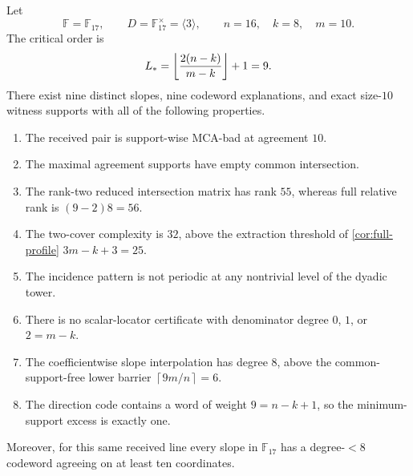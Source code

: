 \documentclass[11pt,a4paper]{amsart}
\numberwithin{equation}{section}
\theoremstyle{remark}
\newcommand{\F}{\mathbb F}\newcommand{\B}{\mathbb B}\newcommand{\K}{\mathbb K}\newcommand{\Z}{\mathbb Z}
\newcommand{\ceil}[1]{\left\lceil #1\right\rceil}\newcommand{\defeq}{\coloneqq}
\begin{document}
\begin{proposition}\label{prop:f17-spread}
Let
\[
 \F=\F_{17},
 \qquad
 D=\F_{17}^{\times}=\langle3\rangle,
 \qquad
 n=16,
 \quad k=8,
 \quad m=10.
\]
The critical order is
\[
 L_*=\left\lfloor \frac{2(n-k)}{m-k}\right\rfloor+1=9.
\]
There exist nine distinct slopes, nine codeword explanations, and exact size-$10$ witness supports with all of the following properties.
\begin{enumerate}[label=\textup{(\roman*)}]
\item The received pair is support-wise MCA-bad at agreement $10$.
\item The maximal agreement supports have empty common intersection.
\item The rank-two reduced intersection matrix has rank $55$, whereas full relative rank is $(9-2)8=56$.
\item The two-cover complexity is $32$, above the extraction threshold of \cref{cor:full-profile} $3m-k+3=25$.
\item The incidence pattern is not periodic at any nontrivial level of the dyadic tower.
\item There is no scalar-locator certificate with denominator degree $0$, $1$, or $2=m-k$.
\item The coefficientwise slope interpolation has degree $8$, above the common-support-free lower barrier $\ceil{9m/n}=6$.
\item The direction code contains a word of weight $9=n-k+1$, so the minimum-support excess is exactly one.
\end{enumerate}
Moreover, for this same received line every slope in $\F_{17}$ has a degree-$<8$ codeword agreeing on at least ten coordinates.
\end{proposition}
\end{document}
